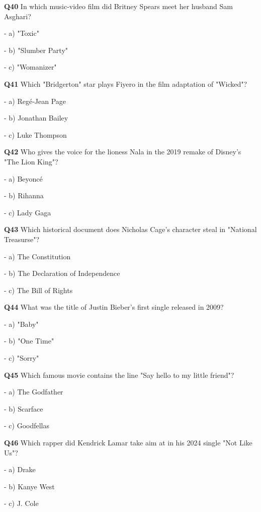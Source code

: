 \textbf{Q40} In which music‑video film did Britney Spears meet her husband Sam Asghari?\par
\quad - a) "Toxic"\par
\quad - b) "Slumber Party"\par
\quad - c) "Womanizer"\par

\textbf{Q41} Which "Bridgerton" star plays Fiyero in the film adaptation of "Wicked"?\par
\quad - a) Regé‑Jean Page\par
\quad - b) Jonathan Bailey\par
\quad - c) Luke Thompson\par

\textbf{Q42} Who gives the voice for the lioness Nala in the 2019 remake of Disney's "The Lion King"?\par
\quad - a) Beyoncé\par
\quad - b) Rihanna\par
\quad - c) Lady Gaga\par

\textbf{Q43} Which historical document does Nicholas Cage's character steal in "National Treasurse"?\par
\quad - a) The Constitution\par
\quad - b) The Declaration of Independence\par
\quad - c) The Bill of Rights\par

\textbf{Q44} What was the title of Justin Bieber's first single released in 2009?\par
\quad - a) "Baby"\par
\quad - b) "One Time"\par
\quad - c) "Sorry"\par

\textbf{Q45} Which famous movie contains the line "Say hello to my little friend"?\par
\quad - a) The Godfather\par
\quad - b) Scarface\par
\quad - c) Goodfellas\par

\textbf{Q46} Which rapper did Kendrick Lamar take aim at in his 2024 single "Not Like Us"?\par
\quad - a) Drake\par
\quad - b) Kanye West\par
\quad - c) J. Cole\par

